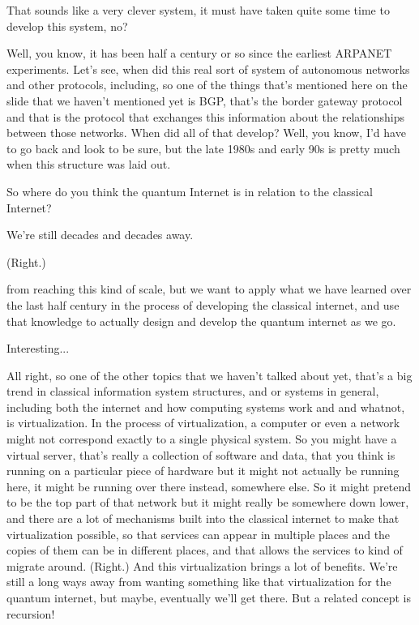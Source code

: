 \mmm That sounds like a very clever system, it must have taken quite some time to develop this system, no?

\rrr Well, you know, it has been half a century or so since the earliest ARPANET experiments.  Let's see, when did this real sort of system of autonomous networks and other protocols, including, so one of the things that's mentioned here on the slide that we haven't mentioned yet is BGP, that's the border gateway protocol and that is the protocol that exchanges this information about the relationships between those networks. When did all of that develop? Well, you know, I'd have to go back and look to be sure, but the late 1980s and early 90s is pretty much when this structure was laid out.

\mmm So where do you think the quantum Internet is in relation to the classical Internet?

\rrr We're still decades and decades away.

\mmm (Right.) 

\rrr from reaching this kind of scale, but we want to apply what we have learned over the last half century in the process of developing the classical internet, and use that knowledge to actually design and develop the quantum internet as we go.

\mmm Interesting...

\rrr All right, so one of the other topics that we haven't talked about yet, that's a big trend in classical information system structures, and or systems in general, including both the internet and how computing systems work and and whatnot, is virtualization. In the process of virtualization, a computer or even a network might not correspond exactly to a single physical system. So you might have a virtual server, that's really a collection of software and data, that you think is running on a particular piece of hardware but it might not actually be running here, it might be running over there instead, somewhere else. So it might pretend to be the top part of that network but it might really be somewhere down lower, and there are a lot of mechanisms built into the classical internet to make that virtualization possible, so that services can appear in multiple places and the copies of them can be in different places, and that allows the services to kind of migrate around. (Right.) And this virtualization brings a lot of benefits. We're still a long ways away from wanting something like that virtualization for the quantum internet, but maybe, eventually we'll get there. But a related concept is recursion!


